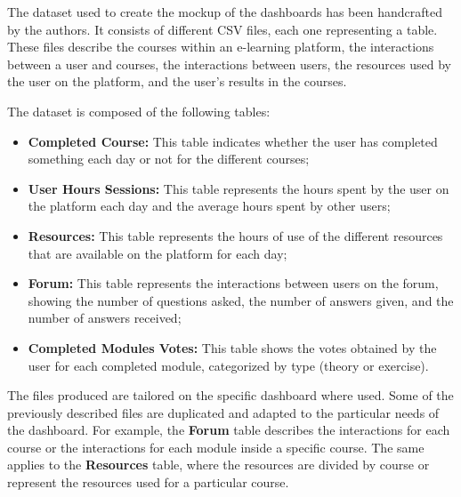 The dataset used to create the mockup of the dashboards has been handcrafted by the authors.
It consists of different CSV files, each one representing a table. These files describe
the courses within an e-learning platform, the interactions between a user and courses,
the interactions between users, the resources used by the user on the platform, and the user's
results in the courses.

The dataset is composed of the following tables:
\begin{itemize}
    \item 
        \textbf{Completed Course:} This table indicates whether the user has completed something each 
        day or not for the different courses;
    \item 
        \textbf{User Hours Sessions:} This table represents the hours spent by the user on the platform 
        each day and the average hours spent by other users;
    \item 
        \textbf{Resources:} This table represents the hours of use of the different resources that are
        available on the platform for each day;
    \item 
        \textbf{Forum:} This table represents the interactions between users on the forum, showing the number
        of questions asked, the number of answers given, and the number of answers received;
    \item 
        \textbf{Completed Modules Votes:} This table shows the votes obtained by the user for each completed module, 
        categorized by type (theory or exercise).
\end{itemize}

The files produced are tailored on the specific dashboard where used. Some of the previously described files
are duplicated and adapted to the particular needs of the dashboard. For example, the \textbf{Forum} table describes
the interactions for each course or the interactions for each module inside a specific course. The same applies to the
\textbf{Resources} table, where the resources are divided by course or represent the resources used for a particular course.
